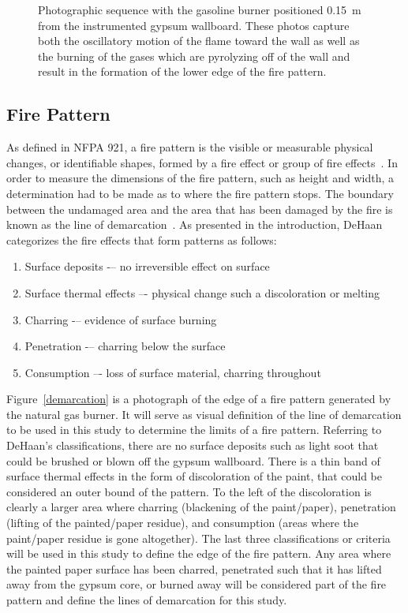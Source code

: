\documentclass[twoside]{uocthesis}
\begin{document}
{\begin{figure}[p]
	\caption[Photographs of motion of the flame with the gasoline burner positioned 0.15~m from the wall]{Photographic sequence with the gasoline burner positioned 0.15~m from the instrumented gypsum wallboard. These photos capture both the oscillatory motion of the flame toward the wall as well as the burning of the gases which are pyrolyzing off of the wall and result in the formation of the lower edge of the fire pattern.}
	\label{IWGBGAS6_seq}
\end{figure}

\subsection{Fire Pattern}

As defined in NFPA 921, a fire pattern is the visible or measurable physical changes, or identifiable shapes, formed by a fire effect or group of fire effects~\cite{NFPA:921}.  In order to measure the dimensions of the fire pattern, such as height and width, a determination had to be made as to where the fire pattern stops.  The boundary between the undamaged area and the area that has been damaged by the fire is known as the line of demarcation~\cite{NFPA:921}.  As presented in the introduction, DeHaan~\cite{DeHaan:2012} categorizes the fire effects that form patterns as follows:
\begin{enumerate}
	\item Surface deposits -– no irreversible effect on surface
	\item Surface thermal effects –- physical change such a discoloration or melting
	\item Charring -– evidence of surface burning
	\item Penetration -– charring below the surface
	\item Consumption –- loss of surface material, charring throughout
\end{enumerate}

Figure~\ref{demarcation} is a photograph of the edge of a fire pattern generated by the natural gas burner.  It will serve as visual definition of the line of demarcation to be used in this study to determine the limits of a fire pattern.  Referring to DeHaan's classifications, there are no surface deposits such as light soot that could be brushed or blown off the gypsum wallboard.  There is a thin band of surface thermal effects in the form of discoloration of the paint, that could be considered an outer bound of the pattern. To the left of the discoloration is clearly a larger area where charring (blackening of the paint/paper), penetration (lifting of the painted/paper residue), and consumption (areas where the paint/paper residue is gone altogether).  The last three classifications or criteria will be used in this study to define the edge of the fire pattern.  Any area where the painted paper surface has been charred, penetrated such that it has lifted away from the gypsum core, or burned away will be considered part of the fire pattern and define the lines of demarcation for this study.

}
\end{document}
